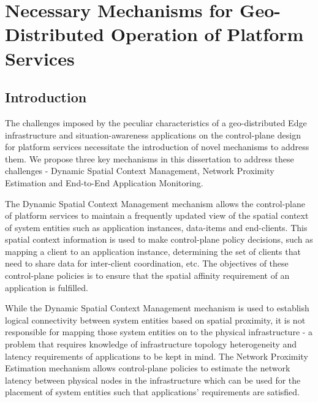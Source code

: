 \chapter{Necessary Mechanisms for Geo-Distributed Operation of Platform Services}

\section{Introduction}
The challenges imposed by the peculiar characteristics of a geo-distributed Edge infrastructure and situation-awareness applications on the control-plane design for platform services necessitate the introduction of novel mechanisms to address them. We propose three key mechanisms in this dissertation to address these challenges - Dynamic Spatial Context Management, Network Proximity Estimation and End-to-End Application Monitoring. 
\par The Dynamic Spatial Context Management mechanism allows the control-plane of platform services to maintain a frequently updated view of the spatial context of system entities such as application instances, data-items and end-clients. This spatial context information is used to make control-plane policy decisions, such as mapping a client to an application instance, determining the set of clients that need to share data for inter-client coordination, etc. The objectives of these control-plane policies is to ensure that the spatial affinity requirement of an application is fulfilled.  
\par While the Dynamic Spatial Context Management mechanism is used to establish logical connectivity between system entities based on spatial proximity, it is not responsible for mapping those system entities on to the physical infrastructure - a problem that requires knowledge of infrastructure topology heterogeneity and latency requirements of applications to be kept in mind. The Network Proximity Estimation mechanism allows control-plane policies to estimate the network latency between physical nodes in the infrastructure which can be used for the placement of system entities such that applications' requirements are satisfied. 
